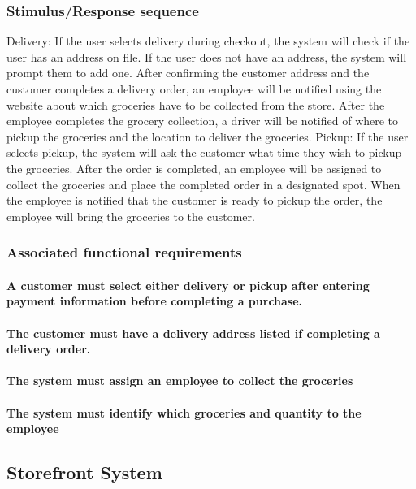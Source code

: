 \documentclass{scrreprt}
\begin{document}
\subsubsection{Stimulus/Response sequence}
Delivery: If the user selects delivery during checkout, the system will check if the user has an address on file.  If the user does not have an address, the system will prompt them to add one.  After confirming the customer address and the customer completes a delivery order, an employee will be notified using the website about which groceries have to be collected from the store.  After the employee completes the grocery collection, a driver will be notified of where to pickup the groceries and the location to deliver the groceries.
Pickup: If the user selects pickup, the system will ask the customer what time they wish to pickup the groceries.  After the order is completed, an employee will be assigned to collect the groceries and place the completed order in a designated spot.  When the employee is notified that the customer is ready to pickup the order, the employee will bring the groceries to the customer.

\subsubsection{Associated functional requirements}
\paragraph[]{\normalfont A customer must select either delivery or pickup after entering payment information before completing a purchase.}
\paragraph[]{\normalfont The customer must have a delivery address listed if completing a delivery order.}
\paragraph[]{\normalfont The system must assign an employee to collect the groceries}
\paragraph[]{\normalfont The system must identify which groceries and quantity to the employee}

\subsection{Storefront System}
\end{document}
